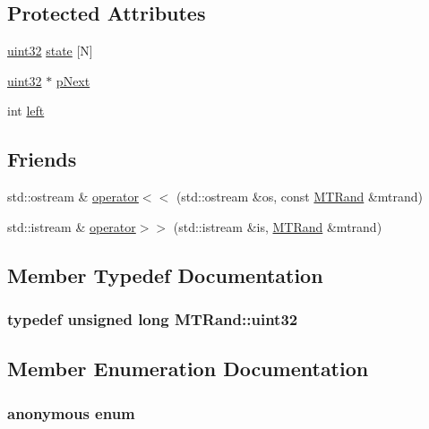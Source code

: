 \begin{CompactItemize}
\begin{CompactItemize}
\subsection*{Protected Attributes}
\begin{CompactItemize}
\item 
\hyperlink{classMTRand_45478edf9e24dcd2a5164bac3889d6a2}{uint32} \hyperlink{classMTRand_2c87f537429bf0b0f6a452c22b9eebba}{state} \mbox{[}N\mbox{]}
\item 
\hyperlink{classMTRand_45478edf9e24dcd2a5164bac3889d6a2}{uint32} $\ast$ \hyperlink{classMTRand_2b80858137c88fe69d4d2bdc665bcf93}{pNext}
\item 
int \hyperlink{classMTRand_98eabf568c88f121e44f487397f32495}{left}
\end{CompactItemize}
\subsection*{Friends}
\begin{CompactItemize}
\item 
std::ostream \& \hyperlink{classMTRand_059061d50a1e54ee3067d4e1dbdd7c64}{operator$<$$<$} (std::ostream \&os, const \hyperlink{classMTRand}{MTRand} \&mtrand)
\item 
std::istream \& \hyperlink{classMTRand_45b02a702835a3be42171c5c2dc79b2d}{operator$>$$>$} (std::istream \&is, \hyperlink{classMTRand}{MTRand} \&mtrand)
\end{CompactItemize}


\subsection{Member Typedef Documentation}
\hypertarget{classMTRand_45478edf9e24dcd2a5164bac3889d6a2}{
\subsubsection[{uint32}]{\setlength{\rightskip}{0pt plus 5cm}typedef unsigned long {\bf MTRand::uint32}}}
\label{classMTRand_45478edf9e24dcd2a5164bac3889d6a2}




\subsection{Member Enumeration Documentation}
\hypertarget{classMTRand_b8fea37d16b55e1a0fe06149e325f1b6}{
\subsubsection[{"@0}]{\setlength{\rightskip}{0pt plus 5cm}anonymous enum}}
\label{classMTRand_b8fea37d16b55e1a0fe06149e325f1b6}



\end{CompactItemize}
\end{CompactItemize}
